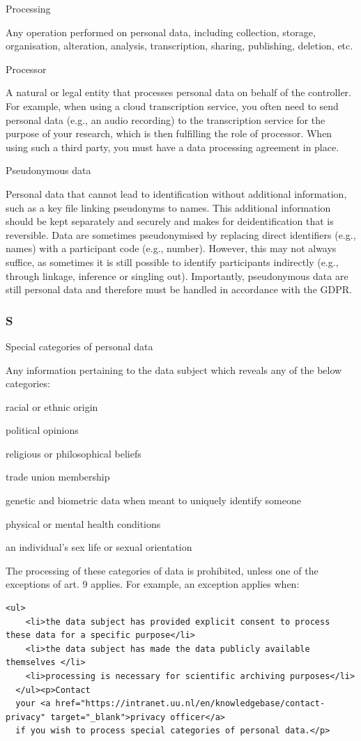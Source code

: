 \documentclass[
]{book}
\begin{document}
Processing

Any operation performed on personal data, including collection, storage, organisation, alteration, analysis,
transcription, sharing, publishing, deletion, etc.

Processor

A natural or legal entity that processes personal data on behalf of the controller. For example, when using
a cloud transcription service, you often need to send personal data (e.g., an audio recording) to the transcription
service for the purpose of your research, which is then fulfilling the role of processor. When using such a third party,
you must have a data processing agreement in place.

Pseudonymous data

Personal data that cannot lead to identification without additional information,
such as a key file linking pseudonyms to names. This additional information should be kept separately and securely
and makes for deidentification that is reversible. Data are sometimes pseudonymised by replacing direct identifiers
(e.g., names) with a participant code (e.g., number). However, this may not always suffice, as sometimes it is still
possible to identify participants indirectly (e.g., through linkage, inference or singling out). Importantly, pseudonymous
data are still personal data and therefore must be handled in accordance with the GDPR.

\hypertarget{s}{%
\subsubsection{S}\label{s}}

Special categories of personal data

Any information pertaining to the data subject which reveals any of the below categories:

racial or ethnic origin

political opinions

religious or philosophical beliefs

trade union membership

genetic and biometric data when meant to uniquely identify someone

physical or mental health conditions

an individual's sex life or sexual orientation

The processing of these categories of data is
prohibited, unless one of the exceptions of
art. 9 applies.
For example, an exception applies when:

\begin{verbatim}
<ul>
    <li>the data subject has provided explicit consent to process these data for a specific purpose</li>
    <li>the data subject has made the data publicly available themselves </li>
    <li>processing is necessary for scientific archiving purposes</li>
  </ul><p>Contact 
  your <a href="https://intranet.uu.nl/en/knowledgebase/contact-privacy" target="_blank">privacy officer</a> 
  if you wish to process special categories of personal data.</p>
\end{verbatim}

  
\end{document}
